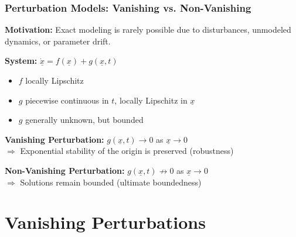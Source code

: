 \documentclass[student, noshadow, lsr, english, aspectratio=169, t]{ITR_LSR_slides}
\begin{document}
\begin{frame}
	\frametitle{Perturbation Models: Vanishing vs. Non-Vanishing}
	\textbf{Motivation:} Exact modeling is rarely possible due to disturbances, unmodeled dynamics, or parameter drift.

	\vspace{0.5em}
	\textbf{System:} $\dot{\underline{x}} = f(\underline{x}) + g(\underline{x}, t)$
	\begin{itemize}
		\item $f$ locally Lipschitz
		\item $g$ piecewise continuous in $t$, locally Lipschitz in $\underline{x}$
		\item $g$ generally unknown, but bounded
	\end{itemize}

	\vspace{0.5em}
	\textbf{Vanishing Perturbation:} $g(\underline{x}, t) \to 0$ as $\underline{x} \to 0$ \\
	$\Rightarrow$ Exponential stability of the origin is preserved (robustness)

	\vspace{0.3em}
	\textbf{Non-Vanishing Perturbation:} $g(\underline{x}, t) \not\to 0$ as $\underline{x} \to 0$ \\
	$\Rightarrow$ Solutions remain bounded (ultimate boundedness)
\end{frame}


\section{Vanishing Perturbations}
\end{document}
